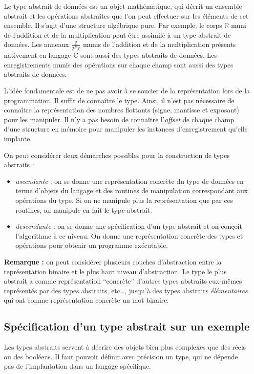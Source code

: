 \documentclass[../../../main.tex]{subfiles}
\begin{document}
Le type abstrait de données est un objet mathématique, qui décrit un ensemble abstrait et les opérations abstraites que l'on peut effectuer sur les éléments de cet ensemble. Il s'agit d'une structure algébrique pure. Par exemple, le corps $\mathbb{R}$ muni de l'addition et de la multiplication peut être assimilé à un type abstrait de données. Les anneaux $\frac{\mathbb{Z}}{2^N\mathbb{Z}}$ munis de l'addition et de la multiplication présents nativement en langage C sont aussi des types abstraits de données. Les enregistrements munis des opérations sur chaque champ sont aussi des types abstraits de données.

L'idée fondamentale est de ne pas avoir à se soucier de la représentation lors de la programmation. Il suffit de connaître le type. Ainsi, il n'est pas nécessaire de connaître la représentation des nombres flottants (signe, mantisse et exposant) pour les manipuler. Il n'y a pas besoin de connaître l'\textit{offset} de chaque champ d'une structure en mémoire pour manipuler les instances d'enregistrement qu'elle implante.

On peut considérer deux démarches possibles pour la construction de types abstraits :
\begin{itemize}
	\item \textit{ascendante} : on se donne une représentation concrète du type de données en terme d'objets du langage et des routines de manipulation correspondant aux opérations du type. Si on ne manipule plus la représentation que par ces routines, on manipule en fait le type abstrait.
	\item \textit{descendante} : on se donne une spécification d'un type abstrait et on conçoit l'algorithme à ce niveau. On donne une représentation concrète des types et opérations pour obtenir un programme exécutable.
\end{itemize}
\textbf{Remarque :} on peut considérer plusieurs couches d'abstraction entre la représentation binaire et le plus haut niveau d'abstraction. Le type le plus abstrait a comme représentation ``concrète'' d'autres types abstraits eux-mêmes représentés par des types abstraits, etc\dots, jusqu'à des types abstraits \textit{élémentaires} qui ont comme représentation concrète un mot binaire.

\subsection{Spécification d'un type abstrait sur un exemple}
Les types abstraits servent à décrire des objets bien plus complexes que des réels ou des booléens. Il faut pouvoir définir avec précision un type, qui ne dépende pas de l'implantation dans un langage spécifique.
\end{document}
